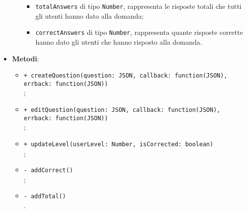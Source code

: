\begin{itemize}
\begin{itemize}
\begin{itemize}
		\item \texttt{totalAnswers} di tipo \texttt{Number}, rappresenta le risposte 					totali che tutti gli utenti hanno dato alla domanda;
		\item \texttt{correctAnswers} di tipo \texttt{Number}, rappresenta quante risposte 		corrette hanno dato gli utenti che hanno risposto alla domanda.
		\end{itemize}
	\end{itemize}
\item \textbf{Metodi}:
	\begin{itemize}
	\item \texttt{+ createQuestion(question: JSON, callback: function(JSON), errback: function(JSON))} \\
	;   
	\item \texttt{+ editQuestion(question: JSON, callback: function(JSON), errback: function(JSON))} \\
	;
	\item \texttt{+ updateLevel(userLevel: Number, isCorrected: boolean)} \\
	;  
	\item \texttt{- addCorrect()} \\
	;
	\item \texttt{- addTotal()} \\
	.
	\end{itemize}
\end{itemize}